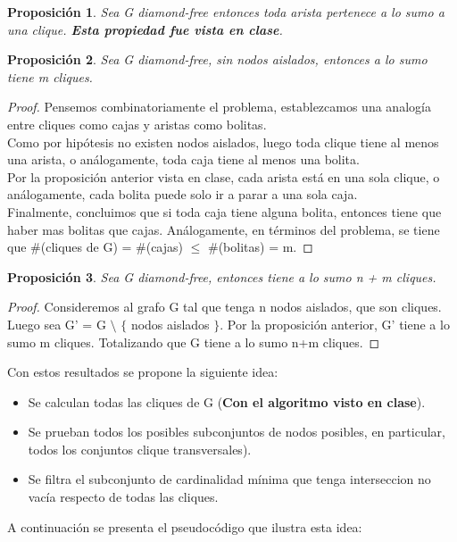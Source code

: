 \documentclass[10pt,a4paper]{article}
\newtheorem{proposition}{Proposici\'on}
\begin{document}
\begin{proposition}
    Sea G diamond-free entonces toda arista pertenece a lo sumo a una clique. \textbf{Esta propiedad fue vista en clase}.
\end{proposition}

\begin{proposition}
    Sea G diamond-free, sin nodos aislados, entonces a lo sumo tiene m cliques.
\end{proposition}
\begin{proof}
    Pensemos combinatoriamente el problema, establezcamos una analogía entre cliques como cajas y aristas como bolitas.\\
    Como por hipótesis no existen nodos aislados, luego toda clique tiene al menos una arista, o análogamente, toda caja tiene al menos una bolita.\\
    Por la proposición anterior vista en clase, cada arista está en una sola clique, o análogamente, cada bolita puede solo ir a parar a una sola caja.\\
    Finalmente, concluimos que si toda caja tiene alguna bolita, entonces tiene que haber mas bolitas que cajas. Análogamente, en términos del problema, se tiene que  \#(cliques de G) = \#(cajas) $\leq$ \#(bolitas) = m. 
\end{proof}

\begin{proposition}
Sea G diamond-free, entonces tiene a lo sumo n + m cliques.
\end{proposition}
\begin{proof}
Consideremos al grafo G tal que tenga n nodos aislados, que son cliques. Luego sea G' = G $\setminus$ $\{$ nodos aislados $\}$. Por la proposición anterior, G' tiene a lo sumo m cliques. Totalizando que G tiene a lo sumo n+m cliques.
\end{proof}

Con estos resultados se propone la siguiente idea:
\begin{itemize}
    \item Se calculan todas las cliques de G (\textbf{Con el algoritmo visto en clase}).
    \item Se prueban todos los posibles subconjuntos de nodos posibles, en particular, todos los conjuntos clique transversales).
    \item Se filtra el subconjunto  de cardinalidad mínima que tenga interseccion no vacía respecto de todas las cliques.
\end{itemize}
A continuación se presenta el pseudocódigo que ilustra esta idea:
\end{document}

